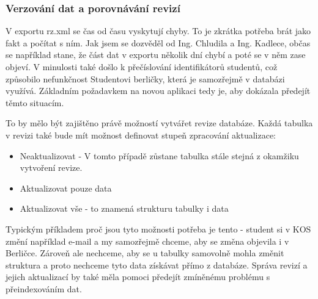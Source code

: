 \documentclass[11pt,twoside,a4paper]{book}
\begin{document}
\subsubsection{Verzování dat a porovnávání revizí}
V exportu rz.xml se čas od času vyskytují chyby. To je zkrátka potřeba brát jako fakt a počítat s ním. Jak jsem se dozvěděl od Ing. Chludila a Ing. Kadlece, občas se například stane, že část dat v exportu několik dní chybí a poté se v něm zase objeví. V minulosti také došlo k přečíslování identifikátorů studentů, což způsobilo nefunkčnost Studentovi berličky, která je samozřejmě v databázi využívá. Základním požadavkem na novou aplikaci tedy je, aby dokázala předejít těmto situacím.

To by mělo být zajištěno právě možností vytvářet revize databáze. Každá tabulka v revizi také bude mít možnost definovat stupeň zpracování aktualizace:
\begin{itemize}
\item Neaktualizovat - V tomto případě zůstane tabulka stále stejná z okamžiku vytvoření revize.
\item Aktualizovat pouze data
\item Aktualizovat vše - to znamená strukturu tabulky i data
\end{itemize}

Typickým příkladem proč jsou tyto možnosti potřeba je tento - student si v KOS změní například e-mail a my samozřejmě chceme, aby se změna objevila i v Berličce. Zároveň ale nechceme, aby se u tabulky samovolně mohla změnit struktura a proto nechceme tyto data získávat přímo z  databáze. Správa revizí a jejich aktualizací by také měla pomoci předejít zmíněnému problému s přeindexováním dat.
\end{document}
